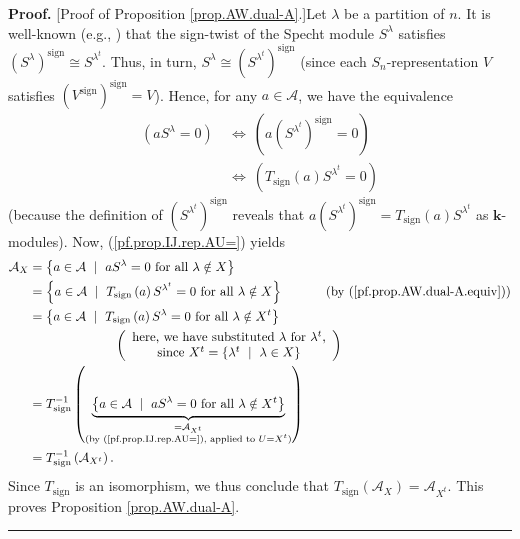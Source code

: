 \documentclass[numbers=enddot,12pt,final,onecolumn,notitlepage]{scrartcl}%
\numberwithin{exer}{subsection}
\theoremstyle{definition}
\newenvironment{proof}[1][Proof]{\noindent\textbf{#1.} }{\ \rule{0.5em}{0.5em}}
\begin{document}
\begin{proof}
[Proof of Proposition \ref{prop.AW.dual-A}.]Let $\lambda$ be a partition of
$n$. It is well-known (e.g., \cite[Theorem 5.18.13]{sga}) that the sign-twist
of the Specht module $S^{\lambda}$ satisfies $\left(  S^{\lambda}\right)
^{\operatorname*{sign}}\cong S^{\lambda^{t}}$. Thus, in turn, $S^{\lambda
}\cong\left(  S^{\lambda^{t}}\right)  ^{\operatorname*{sign}}$ (since each
$S_{n}$-representation $V$ satisfies $\left(  V^{\operatorname*{sign}}\right)
^{\operatorname*{sign}}=V$). Hence, for any $a\in\mathcal{A}$, we have the
equivalence%
\begin{align}
\left(  aS^{\lambda}=0\right)  \  &  \Longleftrightarrow\ \left(  a\left(
S^{\lambda^{t}}\right)  ^{\operatorname*{sign}}=0\right) \nonumber\\
&  \Longleftrightarrow\ \left(  T_{\operatorname*{sign}}\left(  a\right)
S^{\lambda^{t}}=0\right)  \label{pf.prop.AW.dual-A.equiv}%
\end{align}
(because the definition of $\left(  S^{\lambda^{t}}\right)
^{\operatorname*{sign}}$ reveals that $a\left(  S^{\lambda^{t}}\right)
^{\operatorname*{sign}}=T_{\operatorname*{sign}}\left(  a\right)
S^{\lambda^{t}}$ as $\mathbf{k}$-modules). Now, (\ref{pf.prop.IJ.rep.AU=})
yields%
\begin{align*}
\mathcal{A}_{X}  &  =\left\{  a\in\mathcal{A}\ \mid\ aS^{\lambda}=0\text{ for
all }\lambda\notin X\right\} \\
&  =\left\{  a\in\mathcal{A}\ \mid\ T_{\operatorname*{sign}}\left(  a\right)
S^{\lambda^{t}}=0\text{ for all }\lambda\notin X\right\}
\ \ \ \ \ \ \ \ \ \ \left(  \text{by (\ref{pf.prop.AW.dual-A.equiv})}\right)
\\
&  =\left\{  a\in\mathcal{A}\ \mid\ T_{\operatorname*{sign}}\left(  a\right)
S^{\lambda}=0\text{ for all }\lambda\notin X^{t}\right\} \\
&  \ \ \ \ \ \ \ \ \ \ \ \ \ \ \ \ \ \ \ \ \left(
\begin{array}
[c]{c}%
\text{here, we have substituted }\lambda\text{ for }\lambda^{t}\text{,}\\
\text{since }X^{t}=\left\{  \lambda^{t}\ \mid\ \lambda\in X\right\}
\end{array}
\right) \\
&  =T_{\operatorname*{sign}}^{-1}\left(  \underbrace{\left\{  a\in
\mathcal{A}\ \mid\ aS^{\lambda}=0\text{ for all }\lambda\notin X^{t}\right\}
}_{\substack{=\mathcal{A}_{X^{t}}\\\text{(by (\ref{pf.prop.IJ.rep.AU=}),
applied to }U=X^{t}\text{)}}}\right) \\
&  =T_{\operatorname*{sign}}^{-1}\left(  \mathcal{A}_{X^{t}}\right)  .
\end{align*}
Since $T_{\operatorname*{sign}}$ is an isomorphism, we thus conclude that
$T_{\operatorname*{sign}}\left(  \mathcal{A}_{X}\right)  =\mathcal{A}_{X^{t}}%
$. This proves Proposition \ref{prop.AW.dual-A}.
\end{proof}
\end{document}
